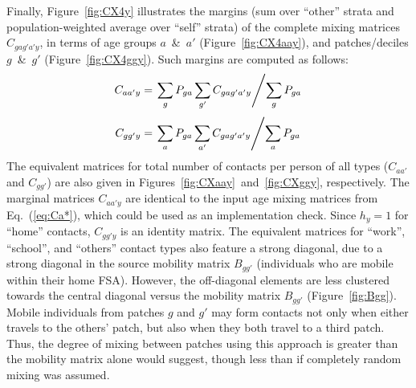 \par
Finally, Figure~\ref{fig:CX4y} illustrates the margins
(sum over ``other'' strata and population-weighted average over ``self'' strata)
of the complete mixing matrices $C_{gag'a'y}$, in terms of
age groups $a$~\&~$a'$ (Figure~\ref{fig:CX4aay}), and
patches/deciles $g$~\&~$g'$ (Figure~\ref{fig:CX4ggy}).
Such margins are computed as follows:
\begin{equation}\label{eq:Caay}
  C_{aa'y} = \left.\sum_{g} P_{ga} \sum_{g'} C_{gag'a'y} \middle/ \sum_{g} P_{ga} \right.
\end{equation}
\begin{equation}\label{eq:Cggy}
  C_{gg'y} = \left.\sum_{a} P_{ga} \sum_{a'} C_{gag'a'y} \middle/ \sum_{a} P_{ga} \right.
\end{equation}
The equivalent matrices for total number of contacts per person of all types
($C_{aa'}$ and $C_{gg'}$) are also given in Figures~\ref{fig:CXaay}~and~\ref{fig:CXggy}, respectively.
The marginal matrices $C_{aa'y}$ are identical to the input age mixing matrices from Eq.~(\ref{eq:Ca*}),
which could be used as an implementation check.
Since $h_y = 1$ for ``home'' contacts, $C_{gg'y}$ is an identity matrix.
The equivalent matrices for ``work'', ``school'', and ``others'' contact types
also feature a strong diagonal, due to a strong diagonal in the source mobility matrix $B_{gg'}$
(individuals who are mobile within their home FSA).
However, the off-diagonal elements are less clustered towards the central diagonal
versus the mobility matrix $B_{gg'}$ (Figure~\ref{fig:Bgg}).
Mobile individuals from patches $g$ and $g'$ may form contacts
not only when either travels to the others' patch,
but also when they both travel to a third patch.
Thus, the degree of mixing between patches using this approach
is greater than the mobility matrix alone would suggest,
though less than if completely random mixing was assumed.
